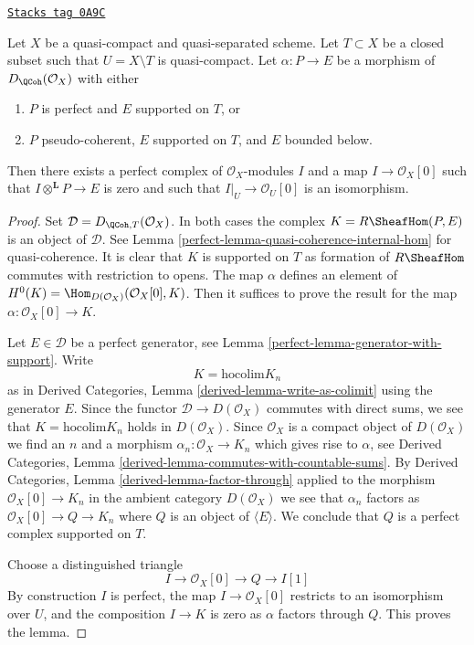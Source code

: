 \begin{lemma}
\label{perfect-lemma-map-from-pseudo-coherent-to-complex-with-support}
\href{https://stacks.math.columbia.edu/tag/0A9C}{\texttt{Stacks tag 0A9C}}

Let $X$ be a quasi-compact and quasi-separated scheme. Let $T \subset X$
be a closed subset such that $U = X \setminus T$ is quasi-compact.
Let $\alpha : P \to E$ be a morphism of $D_\QCoh(\mathcal{O}_X)$ with
either
\begin{enumerate}
\item $P$ is perfect and $E$ supported on $T$, or
\item $P$ pseudo-coherent, $E$ supported on $T$, and $E$ bounded below.
\end{enumerate}
Then there exists a perfect complex of $\mathcal{O}_X$-modules $I$
and a map $I \to \mathcal{O}_X[0]$ such that
$I \otimes^\mathbf{L} P \to E$ is zero and such that
$I|_U \to \mathcal{O}_U[0]$ is an
isomorphism.
\end{lemma}

\begin{proof}

Set $\mathcal{D} = D_{\QCoh, T}(\mathcal{O}_X)$. In both cases the complex
$K = R\SheafHom(P, E)$ is an object of $\mathcal{D}$. See
Lemma \ref{perfect-lemma-quasi-coherence-internal-hom} for quasi-coherence.
It is clear that $K$ is supported on $T$ as formation of $R\SheafHom$
commutes with restriction to opens.
The map $\alpha$ defines an element of
$H^0(K) = \Hom_{D(\mathcal{O}_X)}(\mathcal{O}_X[0], K)$.
Then it suffices to prove the result for the map
$\alpha : \mathcal{O}_X[0] \to K$.

\medskip\noindent
Let $E \in \mathcal{D}$ be a perfect generator, see
Lemma \ref{perfect-lemma-generator-with-support}. Write
$$
K = \text{hocolim} K_n
$$
as in Derived Categories, Lemma \ref{derived-lemma-write-as-colimit}
using the generator $E$. Since the functor $\mathcal{D} \to D(\mathcal{O}_X)$
commutes with direct sums, we see that $K = \text{hocolim} K_n$
holds in $D(\mathcal{O}_X)$. Since $\mathcal{O}_X$ is a compact
object of $D(\mathcal{O}_X)$ we find an $n$ and a morphism
$\alpha_n : \mathcal{O}_X \to K_n$ which gives rise to $\alpha$, see
Derived Categories, Lemma \ref{derived-lemma-commutes-with-countable-sums}.
By Derived Categories, Lemma \ref{derived-lemma-factor-through}
applied to the morphism $\mathcal{O}_X[0] \to K_n$ in the ambient
category $D(\mathcal{O}_X)$ we see that $\alpha_n$ factors as
$\mathcal{O}_X[0] \to Q \to K_n$ where $Q$ is an object
of $\langle E \rangle$. We conclude that $Q$ is a perfect complex
supported on $T$.

\medskip\noindent
Choose a distinguished triangle
$$
I \to \mathcal{O}_X[0] \to Q \to I[1]
$$
By construction $I$ is perfect, the map $I \to \mathcal{O}_X[0]$
restricts to an isomorphism over $U$, and the composition
$I \to K$ is zero as $\alpha$ factors through $Q$.
This proves the lemma.
\end{proof}


